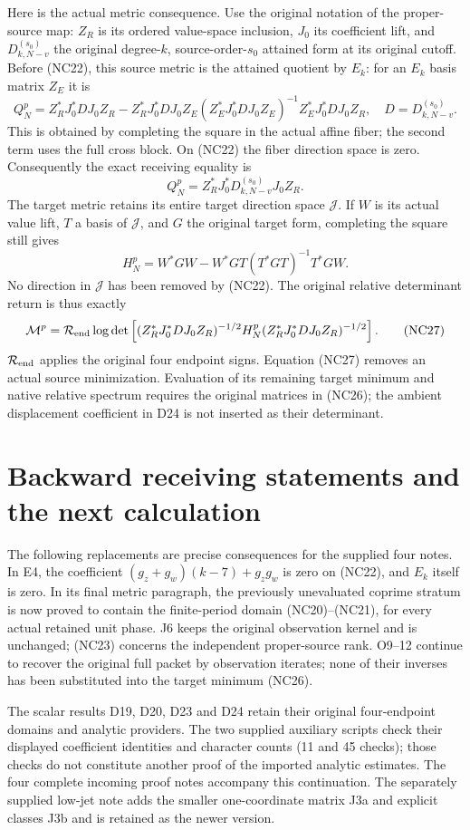 \documentclass[11pt]{article}
\begin{document}
Here is the actual metric consequence. Use the original notation of
the proper-source map: $Z_R$ is its ordered value-space inclusion,
$J_0$ its coefficient lift, and $D_{k,N-v}^{(s_0)}$ the original
degree-$k$, source-order-$s_0$ attained form at its original cutoff.
Before (NC22), this source metric is the attained quotient by $E_k$:
for an $E_k$ basis matrix $Z_E$ it is
\[
 Q_N^p=Z_R^*J_0^*D J_0 Z_R
 -Z_R^*J_0^*D J_0 Z_E
 (Z_E^*J_0^*D J_0 Z_E)^{-1}Z_E^*J_0^*D J_0 Z_R,
 \quad D=D_{k,N-v}^{(s_0)}. \tag{NC24}
\]
This is obtained by completing the square in the actual affine fiber;
the second term uses the full cross block. On (NC22) the fiber
direction space is zero. Consequently the exact receiving equality is
\[
 Q_N^p=Z_R^*J_0^*D_{k,N-v}^{(s_0)}J_0Z_R. \tag{NC25}
\]
The target metric retains its entire target direction space
$\mathcal J$. If $W$ is its actual value lift, $T$ a basis of
$\mathcal J$, and $G$ the original target form, completing the square
still gives
\[
 H_N^p=W^*GW-W^*GT(T^*GT)^{-1}T^*GW. \tag{NC26}
\]
No direction in $\mathcal J$ has been removed by (NC22). The original
relative determinant return is thus exactly
\[
 \mathcal M^p=\mathcal R_{\rm end}\log\det
 \left[(Z_R^*J_0^*D J_0 Z_R)^{-1/2}
        H_N^p(Z_R^*J_0^*D J_0 Z_R)^{-1/2}\right]. \tag{NC27}
\]
$\mathcal R_{\rm end}$ applies the original four endpoint signs.
Equation (NC27) removes an actual source minimization. Evaluation of
its remaining target minimum and native relative spectrum requires
the original matrices in (NC26); the ambient displacement coefficient
in D24 is not inserted as their determinant.

\section{Backward receiving statements and the next calculation}
The following replacements are precise consequences for the supplied
four notes. In E4, the coefficient $(g_z+g_w)(k-7)+g_zg_w$ is zero
on (NC22), and $E_k$ itself is zero. In its final metric paragraph,
the previously unevaluated coprime stratum is now proved to contain
the finite-period domain (NC20)--(NC21), for every actual retained unit
phase. J6 keeps the original observation kernel and is unchanged;
(NC23) concerns the independent proper-source rank. O9--12 continue
to recover the original full packet by observation iterates; none of
their inverses has been substituted into the target minimum (NC26).

The scalar results D19, D20, D23 and D24 retain their original
four-endpoint domains and analytic providers. The two supplied
auxiliary scripts check their displayed coefficient identities and
character counts (11 and 45 checks); those checks do not constitute
another proof of the imported analytic estimates. The four complete
incoming proof notes accompany this continuation. The separately
supplied low-jet note adds the smaller one-coordinate matrix J3a and
explicit classes J3b and is retained as the newer version.
\end{document}

